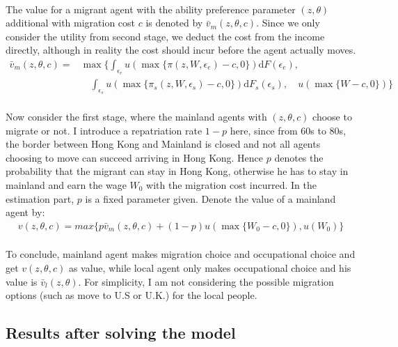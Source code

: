 \documentclass[12pt]{article}
\begin{document}
\paragraph{}
The value for a migrant agent with the ability preference parameter $(z,\theta)$ additional with migration cost $c$ is denoted by $\bar{v}_m (z,\theta,c)$. Since we only consider the utility from second stage, we deduct the cost from the income directly, although in reality the cost should incur before the agent actually moves. 
\begin{align*}
\bar{v}_m (z,\theta,c)=&\max \{\int_{\epsilon_e}u(\max\{\pi(z,W,\epsilon_e)-c,0\})\mathrm{d}F(\epsilon_e) , \\&\quad\int_{\epsilon_s}u(\max\{\pi_s(z,W,\epsilon_s)-c,0\})\mathrm{d}F_s(\epsilon_s), \quad u(\max\{W-c,0\})\}
\end{align*}
\paragraph{}
Now consider the first stage, where the mainland agents with $(z,\theta,c)$ choose to migrate or not. I introduce a repatriation rate $1-p$ here, since from 60s to 80s, the border between Hong Kong and Mainland is closed and not all agents choosing to move can succeed arriving in Hong Kong. Hence $p$ denotes the probability that the migrant can stay in Hong Kong, otherwise he has to stay in mainland and earn the wage $W_0$ with the migration cost incurred. In the estimation part, $p$ is a fixed parameter given. Denote the value of a mainland agent by:
\begin{align*}
v(z,\theta, c)=max \{p \bar{v}_m(z,\theta,c)+(1-p)u(\max\{W_0-c,0\}), u(W_0)\}
\end{align*}
\paragraph{}
To conclude, mainland agent makes migration choice and occupational choice and get $v(z,\theta, c)$ as value, while local agent only makes occupational choice and his value is $\bar{v}_l (z,\theta)$. For simplicity, I am not considering the possible migration options (such as move to U.S or U.K.) for the local people.


\bigskip
\subsection{Results after solving the model}
\end{document}

